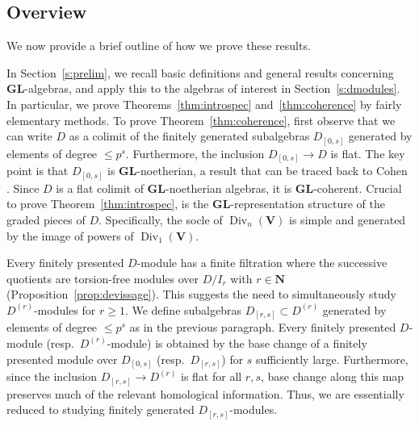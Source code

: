 \documentclass[12pt]{amsart}
\newcommand{\bN}{\mathbf{N}}
\newcommand{\bV}{\mathbf{V}}
\DeclareMathOperator{\Div}{Div}
\newcommand{\Dr}{D^{(r)}}
\newcommand{\Drs}{D_{[r,s]}}
\newcommand{\GL}{\mathbf{GL}}
\numberwithin{equation}{section}
\theoremstyle{definition}
\theoremstyle{plain}
\begin{document}
\subsection{Overview}\label{ss:strategy}
We now provide a brief outline of how we prove these results.

In Section~\ref{s:prelim}, we recall basic definitions and general results concerning $\GL$-algebras, and apply this to the algebras of interest in Section~\ref{s:dmodules}. In particular, we prove Theorems~\ref{thm:introspec} and~\ref{thm:coherence} by fairly elementary methods. To prove Theorem~\ref{thm:coherence}, first observe that we can write $D$ as a colimit of the finitely generated subalgebras $D_{[0,s]}$ generated by elements of degree $\leq p^s$. Furthermore, the inclusion $D_{[0,s]} \to D$ is flat. The key point is that $D_{[0,s]}$ is $\GL$-noetherian, a result that can be traced back to Cohen \cite{co67laws}. Since $D$ is a flat colimit of $\GL$-noetherian algebras, it is $\GL$-coherent. Crucial to prove Theorem~\ref{thm:introspec}, is the $\GL$-representation structure of the graded pieces of $D$. Specifically, the socle of $\Div_n(\bV)$ is simple and generated by the image of powers of $\Div_1(\bV)$.

Every finitely presented $D$-module has a finite filtration where the successive quotients are torsion-free modules over $D/I_r$ with $r \in \bN$ (Proposition~\ref{prop:devissage}). This suggests the need to simultaneously study $\Dr$-modules for $r \geq 1$. 
We define subalgebras $\Drs \subset \Dr$ generated by elements of degree $\leq p^{s}$ as in the previous paragraph.
Every finitely presented $D$-module (resp.~$\Dr$-module) is obtained by the base change of a finitely presented module over $D_{[0,s]}$ (resp.~$\Drs$) for $s$ sufficiently large. Furthermore, since the inclusion $\Drs \to \Dr$ is flat for all $r, s$, base change along this map preserves much of the relevant homological information. Thus, we are essentially reduced to studying finitely generated $\Drs$-modules.
\end{document}
